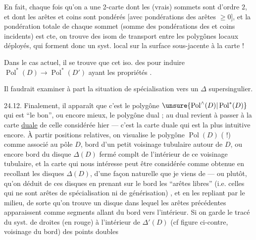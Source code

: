 En fait, chaque fois qu'on a une 2-carte  dont les  (vrais) sommets sont d'ordre $2$, et dont les arêtes et coins sont pondérés [avec pondérations des arêtes $\ge0$],  et la pondération totale de chaque sommet  (somme des pondérations des   et coins incidents) est cte, on trouve des isom de transport entre les polygônes locaux déployés, qui forment donc un syst. local sur la surface sous-jacente à la carte !


Dans le cas actuel, il se trouve que cet iso. des    pour induire  $\operatorname{Pol}^*(D)\longrightarrow\operatorname{Pol}^*(D')$ ayant les propriétés .

Il faudrait examiner à part la situation de spécialisation vers un $\Delta$ supersingulier.

24.12. Finalement, il apparaît que c'est le polygône $\unsure{\operatorname{Pol}^{\wedge}(D)|\operatorname{Pol}^{*}(D)}$ qui est ``le bon'', ou encore mieux, le polygône dual ;   au dual revient à passer à la carte \uline{duale} de celle considérée hier --- c'est la carte duale qui est la plus intuitive encore. À partir  positions relatives, on visualise le polygône  $\operatorname{Pol}(D)$ (  !) comme  associé au pôle $D$, bord d'un petit voisinage tubulaire autour de $D$, ou encore bord du disque $\Delta(D)$ fermé complt de l'intérieur de ce voisinage tubulaire, et la carte qui nous intéresse peut être considérée comme obtenue en recollant les disques $\Delta(D)$, d'une façon naturelle que je viens de  --- ou plutôt,  qu'on déduit de ces disques en prenant  sur le bord les ``arêtes libres'' (i.e. celles qui ne sont arêtes de spécialisation ni de générisation) , et en les repliant par le milieu, de sorte qu'on trouve un disque  dans lequel les arêtes  précédentes apparaissent comme  segments allant du bord vers l'intérieur. Si on garde le tracé du  syst. de droites (en rouge) à l'intérieur de $\Delta'(D)$ (cf figure ci-contre, voisinage du bord)  des points doubles

